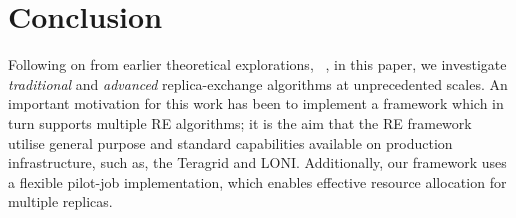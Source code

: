 \documentclass{rspublic}
\begin{document}

\section{Conclusion}
\label{sec:conclusion}

Following on from earlier theoretical explorations,
~\citep{parashar_arepex,DBLP:journals/jcc/GallicchioLP08}, in this
paper, we investigate {\it traditional} and {\it advanced}
replica-exchange algorithms at unprecedented scales.  An important
motivation for this work has been to implement a framework which in
turn supports multiple RE algorithms; it is the aim that the RE
framework utilise general purpose and standard capabilities available
on production infrastructure, such as, the Teragrid and LONI.
Additionally, our framework uses a flexible pilot-job implementation,
which enables effective resource allocation for multiple replicas.
\end{document}
